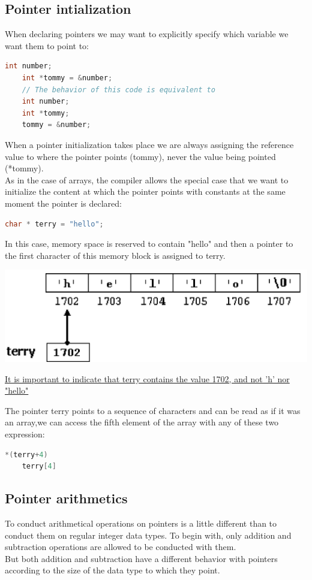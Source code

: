 \documentclass[12pt,oneside]{book}
\begin{document}
\subsection{Pointer intialization}
When declaring pointers we may want to explicitly specify which variable we want them to point to:
\begin{lstlisting}[language=C++]
    int number; 
    int *tommy = &number;
    // The behavior of this code is equivalent to 
    int number; 
    int *tommy; 
    tommy = &number;
\end{lstlisting}
When a pointer initialization takes place we are always assigning the reference value to where the pointer points (tommy), never the value being pointed (*tommy).\\
As in the case of arrays, the compiler allows the special case that we want to initialize the content at which the pointer points with constants at the same moment the pointer is declared:
\begin{lstlisting}[language=C++]
    char * terry = "hello";
\end{lstlisting}
In this case, memory space is reserved to contain "hello" and then a pointer to the first character of this memory block is assigned to terry.
\begin{center}
	\includegraphics[width=0.5\linewidth]{../pic/3316/32.png}
\end{center}
\begin{center}
	\underline{It is important to indicate that terry contains the value 1702, and not 'h' nor "hello"}
\end{center}
The pointer terry points to a sequence of characters and can be read as if it was an array,we can access the fifth element of the array with any of these two expression:
\begin{lstlisting}[language=C++]
    *(terry+4)
    terry[4] 
\end{lstlisting}
\subsection{Pointer arithmetics}
To conduct arithmetical operations on pointers is a little different than to conduct them on regular integer data types. To begin with, only addition and subtraction operations are allowed to be conducted with them.\\
But both addition and subtraction have a different behavior with pointers according to the size of the data type to which they point.\\
\end{document}
